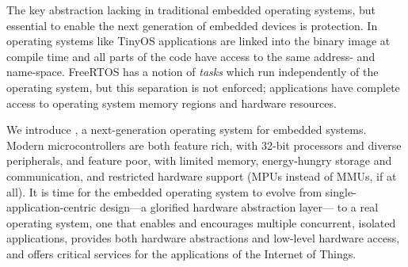 The key abstraction lacking in traditional embedded operating systems, but
essential to enable the next generation of embedded devices is protection. In
operating systems like TinyOS applications are linked into the
binary image at compile time and all parts of the code have access to the
same address- and name-space. FreeRTOS has a notion of \emph{tasks} which run
independently of the operating system, but this separation is not enforced;
applications have complete access to operating system memory regions and
hardware resources.

We introduce \name, a next-generation operating system for embedded systems.
Modern microcontrollers are both feature rich, with 32-bit processors and
diverse peripherals, and feature poor, with limited memory, energy-hungry
storage and communication, and restricted hardware support (MPUs instead of
MMUs, if at all).
%
It is time for the embedded operating system to evolve from single-application-centric
design---a glorified hardware abstraction layer---%
to a real operating system, %
one that enables and encourages multiple concurrent, isolated applications,
provides both hardware abstractions and low-level hardware access, and offers
critical services for the applications of the Internet of Things.


%


